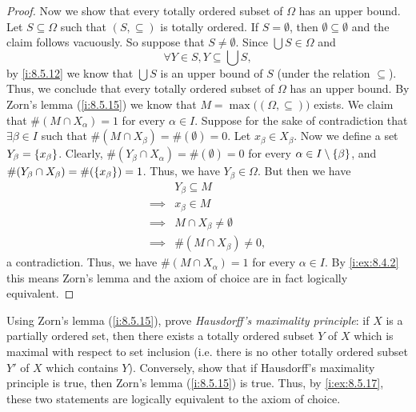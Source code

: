 \begin{proof}
  Now we show that every totally ordered subset of \(\Omega\) has an upper bound.
  Let \(S \subseteq \Omega\) such that \((S, \subseteq)\) is totally ordered.
  If \(S = \emptyset\), then \(\emptyset \subseteq \emptyset\) and the claim follows vacuously.
  So suppose that \(S \neq \emptyset\).
  Since \(\bigcup S \in \Omega\) and
  \[
    \forall Y \in S, Y \subseteq \bigcup S,
  \]
  by \cref{i:8.5.12} we know that \(\bigcup S\) is an upper bound of \(S\) (under the relation \(\subseteq\)).
  Thus, we conclude that every totally ordered subset of \(\Omega\) has an upper bound.
  By Zorn's lemma (\cref{i:8.5.15}) we know that \(M = \max\big((\Omega, \subseteq)\big)\) exists.
  We claim that \(\#(M \cap X_{\alpha}) = 1\) for every \(\alpha \in I\).
  Suppose for the sake of contradiction that \(\exists \beta \in I\) such that \(\#(M \cap X_{\beta}) = \#(\emptyset) = 0\).
  Let \(x_{\beta} \in X_{\beta}\).
  Now we define a set \(Y_{\beta} = \left\lbrace x_{\beta}\right\rbrace\).
  Clearly, \(\#(Y_{\beta} \cap X_{\alpha}) = \#(\emptyset) = 0\) for every \(\alpha \in I \setminus \left\lbrace\beta\right\rbrace\), and \(\#(Y_{\beta} \cap X_{\beta}) = \#(\left\lbrace x_{\beta}\right\rbrace) = 1\).
  Thus, we have \(Y_{\beta} \in \Omega\).
  But then we have
  \begin{align*}
             & Y_{\beta} \subseteq M           \\
    \implies & x_{\beta} \in M                 \\
    \implies & M \cap X_{\beta} \neq \emptyset \\
    \implies & \#(M \cap X_{\beta}) \neq 0,
  \end{align*}
  a contradiction.
  Thus, we have \(\#(M \cap X_{\alpha}) = 1\) for every \(\alpha \in I\).
  By \cref{i:ex:8.4.2} this means Zorn's lemma and the axiom of choice are in fact logically equivalent.
\end{proof}

\begin{ex}\label{i:ex:8.5.18}
  Using Zorn's lemma (\cref{i:8.5.15}), prove \emph{Hausdorff's maximality principle}:
  if \(X\) is a partially ordered set, then there exists a totally ordered subset \(Y\) of \(X\) which is maximal with respect to set inclusion
  (i.e. there is no other totally ordered subset \(Y'\) of \(X\) which contains \(Y\)).
  Conversely, show that if Hausdorff's maximality principle is true, then Zorn's lemma (\cref{i:8.5.15}) is true.
  Thus, by \cref{i:ex:8.5.17}, these two statements are logically equivalent to the axiom of choice.
\end{ex}

